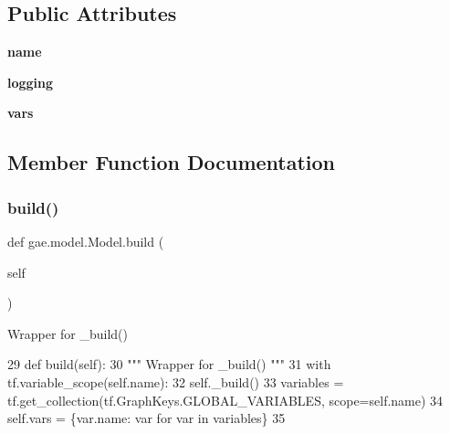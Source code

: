 \subsection*{Public Attributes}
\begin{DoxyCompactItemize}
\item 
\mbox{\label{classgae_1_1model_1_1Model_af936d9906841e14af274763908c6da96}} 
{\bfseries name}
\item 
\mbox{\label{classgae_1_1model_1_1Model_acb51cd2f9bfe1550788fb319645f3671}} 
{\bfseries logging}
\item 
\mbox{\label{classgae_1_1model_1_1Model_af4d50a442f4c7a7b48018efbaf856339}} 
{\bfseries vars}
\end{DoxyCompactItemize}


\subsection{Member Function Documentation}
\mbox{\label{classgae_1_1model_1_1Model_a04510784ad07bd7f15e3798f2730700a}} 
\subsubsection{\texorpdfstring{build()}{build()}\hspace{0.1cm}{\footnotesize\ttfamily [1/3]}}
{\footnotesize\ttfamily def gae.\+model.\+Model.\+build (\begin{DoxyParamCaption}\item[{}]{self }\end{DoxyParamCaption})}

\begin{DoxyVerb}Wrapper for _build() \end{DoxyVerb}
 
\begin{DoxyCode}
29     \textcolor{keyword}{def }build(self):
30         \textcolor{stringliteral}{""" Wrapper for \_build() """}
31         with tf.variable\_scope(self.name):
32             self.\_build()
33         variables = tf.get\_collection(tf.GraphKeys.GLOBAL\_VARIABLES, scope=self.name)
34         self.vars = \{var.name: var \textcolor{keywordflow}{for} var \textcolor{keywordflow}{in} variables\}
35 
\end{DoxyCode}
\mbox{\label{classgae_1_1model_1_1Model_a04510784ad07bd7f15e3798f2730700a}} 
